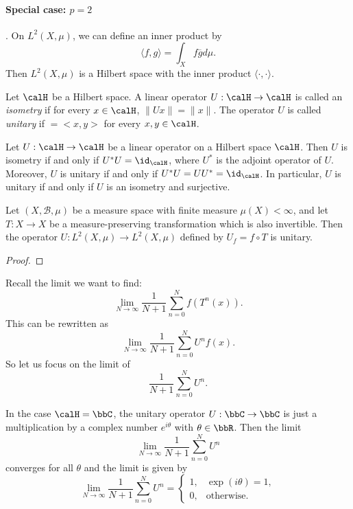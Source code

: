     \paragraph{Special case: \(p=2\)}. On \(L^2(X, \mu)\), we can define an inner product by
    \[ \langle f, g \rangle = \int_X f \overline{g} d\mu. \]
    Then \(L^2(X, \mu)\) is a Hilbert space with the inner product \(\langle \cdot, \cdot \rangle\).

    \begin{definition}\label{def:unitary_operator}
        Let \(\calH\) be a Hilbert space.
        A linear operator \(U: \calH \to \calH\) is called an \emph{isometry} if for every \(x \in \calH\), \(\|Ux\| = \|x\|\).
        The operator \(U\) is called \emph{unitary} if \(<Ux, Uy> = <x, y>\) for every \(x, y \in \calH\).
    \end{definition}

    \begin{proposition}\label{prop:unitary_iff_isometry_and_surjective}
        Let \(U: \calH \to \calH\) be a linear operator on a Hilbert space \(\calH\).
        Then \(U\) is isometry if and only if \(U^* U = \id_\calH\), where \(U^*\) is the adjoint operator of \(U\).
        Moreover, \(U\) is unitary if and only if \(U^* U = U U^* = \id_\calH\).
        In particular, \(U\) is unitary if and only if \(U\) is an isometry and surjective.
    \end{proposition}

    \begin{proposition}\label{prop:U_is_unitary_on_L2}
        Let \((X, \mathcal{B}, \mu)\) be a measure space with finite measure \(\mu(X) < \infty\), and let \(T: X \to X\) be a measure-preserving transformation which is also invertible.
        Then the operator \(U: L^2(X, \mu) \to L^2(X, \mu)\) defined by \(U_f = f \circ T\) is unitary.
    \end{proposition}
    \begin{proof}
    \end{proof}

    Recall the limit we want to find:
    \[ \lim_{N \to \infty} \frac{1}{N+1} \sum_{n=0}^{N} f(T^n(x)). \]
    This can be rewritten as
    \[ \lim_{N \to \infty} \frac{1}{N+1} \sum_{n=0}^{N} U^n f(x). \]
    So let us focus on the limit of
    \[ \frac{1}{N+1} \sum_{n=0}^{N} U^n. \]

    In the case \(\calH = \bbC\), the unitary operator \(U: \bbC \to \bbC\) is just a multiplication by a complex number \(e^{i\theta}\) with \(\theta \in \bbR\).
    Then the limit
    \[ \lim_{N \to \infty} \frac{1}{N+1} \sum_{n=0}^{N} U^n \]
    converges for all \(\theta\) and the limit is given by
    \[ \lim_{N \to \infty} \frac{1}{N+1} \sum_{n=0}^{N} U^n = \begin{cases}
        1, & \exp(i\theta) = 1, \\
        0, & \text{otherwise}.
    \end{cases} \]

